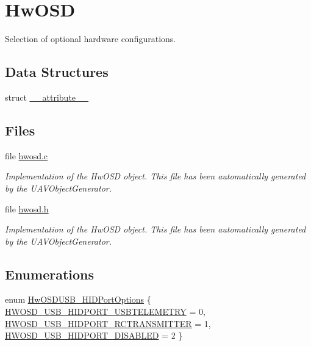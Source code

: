 \hypertarget{group___hw_o_s_d}{\section{\-Hw\-O\-S\-D}
\label{group___hw_o_s_d}
}


\-Selection of optional hardware configurations.  


\subsection*{\-Data \-Structures}
\begin{DoxyCompactItemize}
\item 
struct \hyperlink{struct____attribute____}{\-\_\-\-\_\-attribute\-\_\-\-\_\-}
\end{DoxyCompactItemize}
\subsection*{\-Files}
\begin{DoxyCompactItemize}
\item 
file \hyperlink{hwosd_8c}{hwosd.\-c}
\begin{DoxyCompactList}\small\item\em \-Implementation of the \-Hw\-O\-S\-D object. \-This file has been automatically generated by the \-U\-A\-V\-Object\-Generator. \end{DoxyCompactList}\item 
file \hyperlink{hwosd_8h}{hwosd.\-h}
\begin{DoxyCompactList}\small\item\em \-Implementation of the \-Hw\-O\-S\-D object. \-This file has been automatically generated by the \-U\-A\-V\-Object\-Generator. \end{DoxyCompactList}\end{DoxyCompactItemize}
\subsection*{\-Enumerations}
\begin{DoxyCompactItemize}
\item 
enum \hyperlink{group___hw_o_s_d_ga03f323376d0e6c32124734378923e77f}{\-Hw\-O\-S\-D\-U\-S\-B\-\_\-\-H\-I\-D\-Port\-Options} \{ \hyperlink{group___hw_o_s_d_gga03f323376d0e6c32124734378923e77fab8c0e0ff405e0a4dc67228f7e7422b80}{\-H\-W\-O\-S\-D\-\_\-\-U\-S\-B\-\_\-\-H\-I\-D\-P\-O\-R\-T\-\_\-\-U\-S\-B\-T\-E\-L\-E\-M\-E\-T\-R\-Y} = 0, 
\hyperlink{group___hw_o_s_d_gga03f323376d0e6c32124734378923e77fa64c2cf1218ef6771488df2e2e34bbcf5}{\-H\-W\-O\-S\-D\-\_\-\-U\-S\-B\-\_\-\-H\-I\-D\-P\-O\-R\-T\-\_\-\-R\-C\-T\-R\-A\-N\-S\-M\-I\-T\-T\-E\-R} = 1, 
\hyperlink{group___hw_o_s_d_gga03f323376d0e6c32124734378923e77fa69999df955022957c244fd57e2d13f9e}{\-H\-W\-O\-S\-D\-\_\-\-U\-S\-B\-\_\-\-H\-I\-D\-P\-O\-R\-T\-\_\-\-D\-I\-S\-A\-B\-L\-E\-D} = 2
 \}
\end{DoxyCompactItemize}
